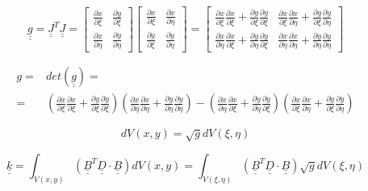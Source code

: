 \documentclass[a4paper]{jpconf}
\begin{document}
\begin{equation}
\underline{\underline{g}}=\underline{\underline{J}}^{T}\underline{\underline{J}}=\begin{bmatrix}
\frac{\partial x}{\partial\xi}&\frac{\partial y}{\partial\xi}\\\frac{\partial x}{\partial\eta}&\frac{\partial y}{\partial\eta}
\end{bmatrix}\begin{bmatrix}
\frac{\partial x}{\partial\xi}&\frac{\partial x}{\partial\eta}\\\frac{\partial y}{\partial\xi}&\frac{\partial y}{\partial\eta}
\end{bmatrix}=\begin{bmatrix}
\frac{\partial x}{\partial\xi}\frac{\partial x}{\partial\xi}+\frac{\partial y}{\partial\xi}\frac{\partial y}{\partial\xi}&\frac{\partial x}{\partial\xi}\frac{\partial x}{\partial\eta}+\frac{\partial y}{\partial\xi}\frac{\partial y}{\partial\eta}\\\frac{\partial x}{\partial\eta}\frac{\partial x}{\partial\xi}+\frac{\partial y}{\partial\eta}\frac{\partial y}{\partial\xi}&\frac{\partial x}{\partial\eta}\frac{\partial x}{\partial\eta}+\frac{\partial y}{\partial\eta}\frac{\partial y}{\partial\eta}
\end{bmatrix}
\end{equation}

\begin{equation}
\begin{split}
g=&det\left(\underline{\underline{g}}\right)=\\=&\left(\frac{\partial x}{\partial\xi}\frac{\partial x}{\partial\xi}+\frac{\partial y}{\partial\xi}\frac{\partial y}{\partial\xi}\right)\left(\frac{\partial x}{\partial\eta}\frac{\partial x}{\partial\eta}+\frac{\partial y}{\partial\eta}\frac{\partial y}{\partial\eta}\right)-\left(\frac{\partial x}{\partial\eta}\frac{\partial x}{\partial\xi}+\frac{\partial y}{\partial\eta}\frac{\partial y}{\partial\xi}\right)\left(\frac{\partial x}{\partial\xi}\frac{\partial x}{\partial\eta}+\frac{\partial y}{\partial\xi}\frac{\partial y}{\partial\eta}\right)
\end{split}
\end{equation}

\begin{equation}
dV\left(x,y\right)=\sqrt{g}dV\left(\xi,\eta\right)
\end{equation}

\begin{equation}
\underline{\underline{k}}=\int_{V\left(x,y\right)}\left(\underline{\underline{B}}^{T}\underline{\underline{D}}\cdot\underline{\underline{B}}\right)dV\left(x,y\right)=\int_{V\left(\xi,\eta\right)}\left(\underline{\underline{B}}^{T}\underline{\underline{D}}\cdot\underline{\underline{B}}\right)\sqrt{g}dV\left(\xi,\eta\right)
\end{equation}
\end{document}
